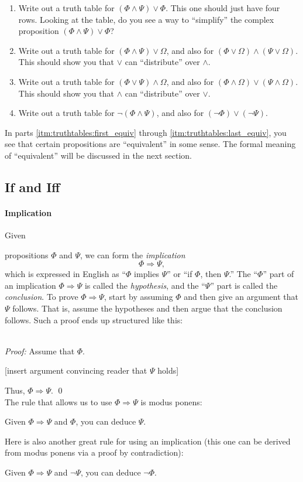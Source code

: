 \documentclass[12pt]{article}
\newcommand{\done}{\\\hspace*{0pt}\hfill$\blacksquare$}
\newcommand{\AND}{\wedge}
\newcommand{\OR}{\vee}
\newcommand{\ARR}{\Rightarrow}
\newcounter{rule}
\newcounter{theorem}
\def\putRuleNumber{\refstepcounter{rule}\therule}
\newcommand{\indented}[1]{\begin{adjustwidth}{1em}{}#1\end{adjustwidth}}
\def\thmcolonspace{\hspace{1em}}
\def\proofnewline{\\[0.75em]} %
\def\done{\qed\\[0em]} %
\newcommand{\thmbox}[1]{\fbox{\parbox{\textwidth}{{#1}}}}
\newcommand{\THMMOCK}[2]{\thmbox{\textbf{Theorem:} \thmcolonspace #1} \proofnewline \textit{Proof:} #2\done}
\newcommand{\RULE}[2]{\begin{tcolorbox}[title=Rule \putRuleNumber: #1,colbacktitle=white,coltitle=black,colback=white]#2\end{tcolorbox}}
\newcommand{\DRULE}[2]{\begin{tcolorbox}[title=Derived Rule \putRuleNumber: #1,colbacktitle=white,coltitle=black,colback=white]#2\end{tcolorbox}} %
\def\pA{\Phi}
\def\pB{\Psi}
\def\pC{\Omega}
\begin{document}
{\begin{enumerate}
\item
Write out a truth table for $(\pA\AND\pB)\OR\pA$. This one should just have four rows.
Looking at the table, do you see a way to ``simplify'' the complex proposition  $(\pA\AND\pB)\OR\pA$?

\item
Write out a truth table for $(\pA\AND\pB)\OR\pC$, and also for $(\pA\OR\pC)\AND(\pB\OR\pC)$.
This should show you that $\OR$ can ``distribute'' over $\AND$.

\item
Write out a truth table for $(\pA\OR\pB)\AND\pC$, and also for $(\pA\AND\pC)\OR(\pB\AND\pC)$.
This should show you that $\AND$ can ``distribute'' over $\OR$.

\item \label{itm:truthtables:last_equiv}
Write out a truth table for $\neg(\pA\AND\pB)$, and also for $(\neg\pA)\OR(\neg\pB)$.
\end{enumerate}
In parts \ref{itm:truthtables:first_equiv} through \ref{itm:truthtables:last_equiv},
you see that certain propositions are ``equivalent'' in some sense. The formal meaning of ``equivalent'' will be
discussed in the next section.
}


\subsection{If and Iff}

\paragraph{Implication}
\hypertarget{hl:ARR}{Given} propositions $\pA$ and $\pB$, we can form the \emph{implication}
$$
\pA\ARR\pB,
$$
which is expressed in English as ``$\pA$ implies $\pB$'' or ``if $\pA$, then $\pB$.''
The ``$\pA$'' part of an implication $\pA\ARR\pB$ is called the \emph{hypothesis},
and the ``$\pB$'' part is called the \emph{conclusion}.
\hypertarget{hl:ARRPV}{To} prove $\pA\ARR\pB$,
start by assuming $\pA$ and
then give an argument that $\pB$ follows.
That is, assume the hypotheses and then argue that the conclusion follows.
Such a proof ends up structured like this:

\THMMOCK{If $\pA$, then $\pB$.}{
Assume that $\pA$.
\indented{[insert argument convincing reader that $\pB$ holds]}
Thus, $\pA\ARR\pB$.
}

\hypertarget{hl:ARRUSE}{The} rule that allows us to use $\pA\ARR\pB$ is modus ponens:
\RULE{Modus ponens}{
Given $\pA\ARR\pB$ and $\pA$, you can deduce $\pB$.
}
Here is also another great rule for using an implication (this one can be derived from modus ponens via a proof by contradiction):
\DRULE{Modus tollens}{
Given $\pA\ARR\pB$ and $\neg\pB$, you can deduce $\neg\pA$.
}
\end{document}
